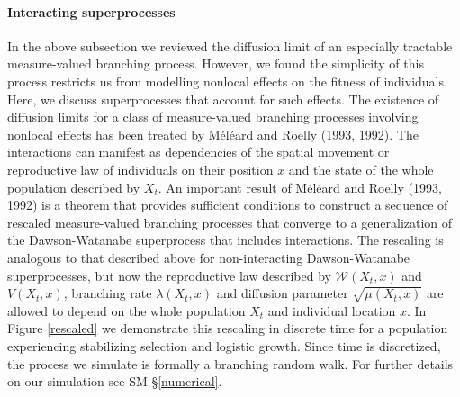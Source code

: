 \documentclass[]{elsarticle} %
\begin{document}
\paragraph{Interacting superprocesses}

In the above subsection we reviewed the diffusion limit of an especially
tractable measure-valued branching process. However, we found the
simplicity of this process restricts us from modelling nonlocal effects
on the fitness of individuals. Here, we discuss superprocesses that
account for such effects. The existence of diffusion limits for a class
of measure-valued branching processes involving nonlocal effects has
been treated by Méléard and Roelly (1993, 1992). The interactions can
manifest as dependencies of the spatial movement or reproductive law of
individuals on their position \(x\) and the state of the whole
population described by \(X_t\). An important result of Méléard and
Roelly (1993, 1992) is a theorem that provides sufficient conditions to
construct a sequence of rescaled measure-valued branching processes that
converge to a generalization of the Dawson-Watanabe superprocess that
includes interactions. The rescaling is analogous to that described
above for non-interacting Dawson-Watanabe superprocesses, but now the
reproductive law described by \(\mathscr{W}(X_t,x)\) and \(V(X_t,x)\),
branching rate \(\lambda(X_t,x)\) and diffusion parameter
\(\sqrt{\mu(X_t,x)}\) are allowed to depend on the whole population
\(X_t\) and individual location \(x\). In Figure \ref{rescaled} we
demonstrate this rescaling in discrete time for a population
experiencing stabilizing selection and logistic growth. Since time is
discretized, the process we simulate is formally a branching random
walk. For further details on our simulation see SM \S\ref{numerical}.
\end{document}
